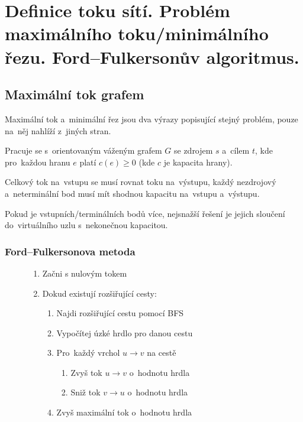 \clearpage
\section{Definice toku sítí. Problém maximálního toku/minimálního řezu. Ford--Fulkersonův algoritmus.}


\subsection{Maximální tok grafem}

Maximální tok a~minimální řez jsou dva výrazy popisující stejný problém, pouze na~něj nahlíží z~jiných stran.

Pracuje se s~orientovaným váženým grafem $G$ se zdrojem $s$ a~cílem $t$, kde pro~každou hranu $e$ platí $c(e) \geq 0$ (kde $c$ je kapacita hrany).

Celkový tok na~vstupu se musí rovnat toku na~výstupu, každý nezdrojový a~neterminální bod musí mít shodnou kapacitu na~vstupu a~výstupu.

Pokud je vstupních/terminálních bodů více, nejsnažší řešení je jejich sloučení do~virtuálního uzlu s~nekonečnou kapacitou.

\subsubsection{Ford--Fulkersonova metoda}

\begin{figure}[ht]
\onehalfspacing
\begin{enumerate}
\item Začni s nulovým tokem
\item Dokud existují rozšiřující cesty:
    \begin{enumerate}
    \item Najdi rozšiřující cestu pomocí BFS
    \item Vypočítej úzké hrdlo pro danou cestu
    \item Pro~každý vrchol $u \rightarrow v$ na cestě
        \begin{enumerate}
        \item Zvyš tok $u \rightarrow v$ o~hodnotu hrdla
        \item Sniž tok $v \rightarrow u$ o~hodnotu hrdla
        \end{enumerate}
    \item Zvyš maximální tok o~hodnotu hrdla
    \end{enumerate}
\end{enumerate}
\end{figure}


